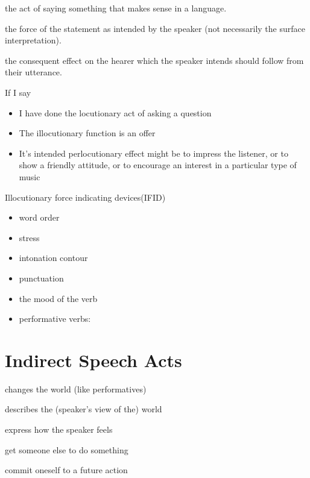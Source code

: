 \documentclass[headrule,footrule]{foils}
\begin{document}
\begin{description}\addtolength{\itemsep}{-1.5ex}
\item {} the act of saying something that makes
  sense in a language.
\item {} the force of the statement
  as intended by the speaker (not necessarily the surface interpretation).
\item {} the consequent effect on the hearer which
  the speaker intends should follow from their utterance.
\end{description}
If I say 
\begin{itemize}\addtolength{\itemsep}{-1.5ex}
\item I have done the locutionary act of asking a question
\item The  illocutionary function is an offer
\item It's intended perlocutionary effect might be to impress the
  listener, or to show a friendly attitude, or to encourage an
  interest in a particular type of music
\end{itemize}



\newpage
Illocutionary force indicating devices(IFID)
\begin{itemize}
\item   word order
\item    stress
\item    intonation contour
\item    punctuation
\item    the mood of the verb
\item     performative verbs:  
\end{itemize}




\section{Indirect Speech Acts}



\begin{description}
  \item {} changes the world (like performatives)
  \item {} describes the (speaker's view of the) world 
  \item {}  express how the speaker feels
  \item {} get someone else to do something
  \item {} commit oneself to a future action
  \end{description}
\end{document}
